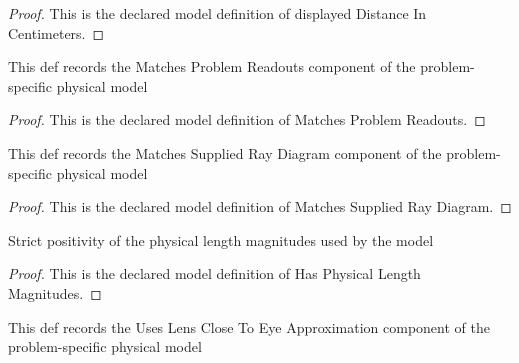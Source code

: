 \begin{proof}
  This is the declared model definition of displayed Distance In Centimeters.
\end{proof}
\begin{definition}
  \label{def:physics:phyx-mini-0129:phyxminiproblems-problemphyxmini0129-matchesproblemreadouts}
  This def records the Matches Problem Readouts component of the problem-specific physical model
\end{definition}
\begin{proof}
  This is the declared model definition of Matches Problem Readouts.
\end{proof}
\begin{definition}
  \label{def:physics:phyx-mini-0129:phyxminiproblems-problemphyxmini0129-matchessuppliedraydiagram}
  This def records the Matches Supplied Ray Diagram component of the problem-specific physical model
\end{definition}
\begin{proof}
  This is the declared model definition of Matches Supplied Ray Diagram.
\end{proof}
\begin{definition}
  \label{def:physics:phyx-mini-0129:phyxminiproblems-problemphyxmini0129-hasphysicallengthmagnitudes}
  Strict positivity of the physical length magnitudes used by the model
\end{definition}
\begin{proof}
  This is the declared model definition of Has Physical Length Magnitudes.
\end{proof}
\begin{definition}
  \label{def:physics:phyx-mini-0129:phyxminiproblems-problemphyxmini0129-useslensclosetoeyeapproximation}
  This def records the Uses Lens Close To Eye Approximation component of the problem-specific physical model
\end{definition}
